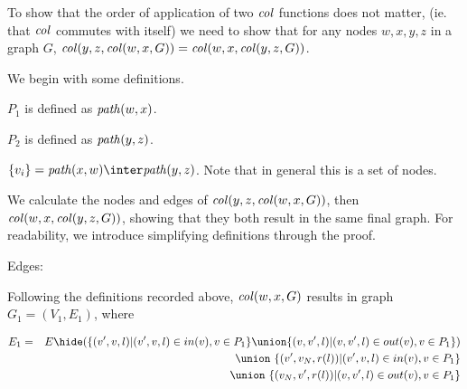 To show that  the order of application of two $\mathit{col}$ functions does not matter, (ie. that $\mathit{col}$ commutes with itself)  we need to show that for any nodes $w,x,y,z$ in a graph $G$, $\mathit{col}(y,z,\mathit{col}(w,x,G)) = \mathit{col}(w,x,\mathit{col}(y,z,G))$. 


We begin with some definitions.

$P_1$ is defined as $\mathit{path}(w,x)$.

$P_2$ is defined as $\mathit{path}(y,z)$.

$\{v_i\} = \Path(x,w) \inter \Path(y,z)$. Note that in general this is a set of nodes. 










We  calculate the nodes and edges of  $\mathit{col}(y,z,\mathit{col}(w,x,G))$,  then $\mathit{col}(w,x,\mathit{col}(y,z,G))$, showing that they both result in the same final graph. For readability, we introduce simplifying definitions through the proof. 


Edges:

Following the definitions recorded above, $\mathit{col}(w,x,G)$ results in graph $G_1=(V_1,E_1)$, where

\begin{eqnarray*}
  E_1 & = & E\hide (
                   \{(v',v,l)|(v',v,l) \in in(v), v\in P_1\}
                   \union
                   \{(v,v',l)|(v,v',l) \in out(v), v\in P_1\}
                  )\\
  && \union\ \{(v',v_{N},r(l))|(v',v,l) \in in(v), v\in P_1\}\\
  && \union\ \{(v_{N},v',r(l))|(v,v',l) \in out(v), v\in P_1\}\\
\end{eqnarray*}

